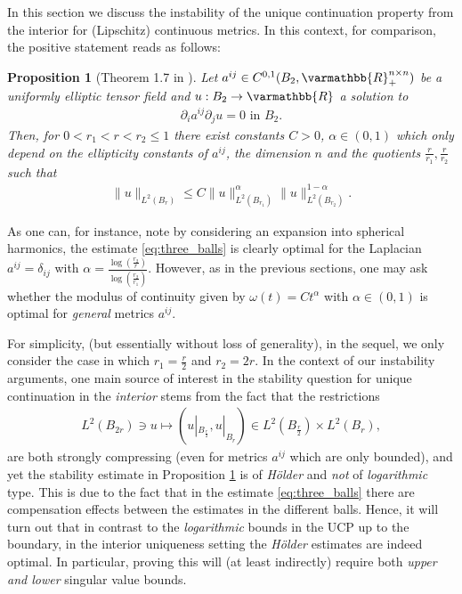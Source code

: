 \documentclass[12pt,twoside]{amsart}
\numberwithin{equation}{section}
\renewcommand{\leq}{\leqslant}
\renewcommand{\mathbb}{\varmathbb}
\newtheorem{proposition}[theorem]{Proposition}
\newcommand {\R} {\mathbb{R}} \newcommand {\Z} {\mathbb{Z}}
\newcommand {\p} {\partial}
\begin{document}
\begin{appendix}
In this section we discuss the instability of the unique continuation property from the interior for (Lipschitz) continuous metrics. In this context, for comparison, the positive statement reads as follows:

\begin{proposition}[Theorem 1.7 in \cite{AlessandriniRondiRossetVessella}]
\label{prop:three_spheres}
Let $a^{ij}\in C^{0,1}(B_2, \R^{n \times n}_{+})$ be a uniformly elliptic tensor field and $u: B_2 \rightarrow \R$ a solution to
\begin{align*}
\p_i a^{ij} \p_j u = 0 \mbox{ in } B_2.
\end{align*}
Then, for $0<r_1 < r < r_2 \leq 1$ there exist constants $C>0$, $\alpha \in (0,1)$ which only depend on the ellipticity constants of $a^{ij}$, the dimension $n$ and the quotients $\frac{r}{r_1}, \frac{r}{r_2}$ such that 
\begin{align}
\label{eq:three_balls}
\| u \|_{L^2(B_r)} \leq C \|u\|_{L^2(B_{r_1})}^{\alpha} \|u\|_{L^2(B_{r_2})}^{1-\alpha}.
\end{align}
\end{proposition}

As one can, for instance, note by considering an expansion into spherical harmonics, the estimate \eqref{eq:three_balls} is clearly optimal for the Laplacian $a^{ij}=\delta_{ij}$ with $\alpha = \frac{\log\left( \frac{r_2}{r} \right)}{\log\left( \frac{r_2}{r_1} \right)}$. However, as in the previous sections, one may ask whether the modulus of continuity given by $\omega(t) = C t^{\alpha}$ with $\alpha \in (0,1)$ is optimal for \emph{general} metrics $a^{ij}$. 

For simplicity, (but essentially without loss of generality), in the sequel, we only consider the case in which $r_1 = \frac{r}{2}$ and $r_2 = 2r$.
In the context of our instability arguments, one main source of interest in the stability question for unique continuation in the \emph{interior} stems from the fact that the restrictions
\begin{align*}
L^2(B_{2 r}) \ni u \mapsto (u|_{B_{\frac{r}{2}}}, u|_{B_{r}}) \in L^2(B_{\frac{r}{2}}) \times L^2(B_r) ,
\end{align*}
are both strongly compressing (even for metrics $a^{ij}$ which are only bounded), and yet the stability estimate in Proposition \ref{prop:three_spheres} is of \emph{H{\"o}lder} and \emph{not} of \emph{logarithmic} type. This is due to the fact that in the estimate \eqref{eq:three_balls} there are compensation effects between the estimates in the different balls. Hence, it will turn out that in contrast to the \emph{logarithmic} bounds in the UCP up to the boundary, in the interior uniqueness setting the \emph{H{\"o}lder} estimates are indeed optimal. In particular, proving this will (at least indirectly) require both \emph{upper and lower} singular value bounds.


\end{appendix}
\end{document}
